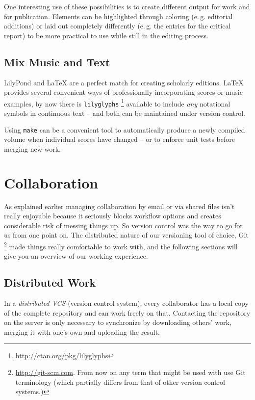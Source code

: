 \documentclass[11pt,a4paper]{article}
\begin{document}
One interesting use of these possibilities is to create different output for work and for
publication. Elements can be highlighted through coloring (e.\,g. editorial additions)
or laid out completely differently (e.\,g. the entries for the critical report) to be
more practical to use while still in the editing process.

\subsection{Mix Music and Text}
LilyPond and \LaTeX{} are a perfect match for creating scholarly editions. \LaTeX{}
provides several convenient ways of professionally incorporating scores or music examples,
by now there is \texttt{lilyglyphs}%
\footnote{\url{http://ctan.org/pkg/lilyglyphs}}
available to include \emph{any} notational symbols in continuous text -- and both
can be maintained under version control.

Using \texttt{make} can be a convenient tool to automatically produce a newly compiled
volume when individual scores have changed -- or to enforce unit tests before merging
new work.

\section{Collaboration}\label{sec:collaboration}
As explained earlier managing collaboration by email or via shared files isn't really
enjoyable because it seriously blocks workflow options and creates considerable risk
of messing things up. So version control was the way to go for us from one point on.
The distributed nature of our versioning tool of choice, Git%
\footnote{\url{http://git-scm.com}. From now on any term that might be used with use
Git terminology (which partially differs from that of other version control systems.)}
made things really comfortable to work with, and the following sections will give you
an overview of our working experience.

\subsection{Distributed Work}
In a \textsl{distributed VCS} (version control system), every collaborator
has a local copy of the complete repository and can work freely on that.
Contacting the repository on the server is only necessary to synchronize by downloading
others' work, merging it with one's own and uploading the result.
\end{document}
